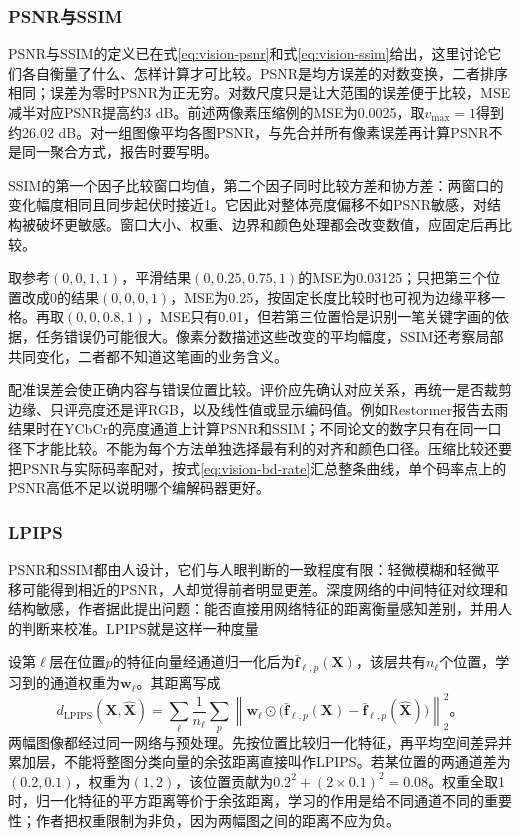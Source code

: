 \subsubsection{PSNR与SSIM}
\label{sec:vision-restoration-psnr-ssim}

PSNR与SSIM的定义已在式\eqref{eq:vision-psnr}和式\eqref{eq:vision-ssim}给出，这里讨论它们各自衡量了什么、怎样计算才可比较。PSNR是均方误差的对数变换，二者排序相同；误差为零时PSNR为正无穷。对数尺度只是让大范围的误差便于比较，MSE减半对应PSNR提高约3 dB。前述两像素压缩例的MSE为0.0025，取$v_{\max}=1$得到约26.02 dB。对一组图像平均各图PSNR，与先合并所有像素误差再计算PSNR不是同一聚合方式，报告时要写明。

SSIM的第一个因子比较窗口均值，第二个因子同时比较方差和协方差：两窗口的变化幅度相同且同步起伏时接近1。它因此对整体亮度偏移不如PSNR敏感，对结构被破坏更敏感。窗口大小、权重、边界和颜色处理都会改变数值，应固定后再比较。

取参考$(0,0,1,1)$，平滑结果$(0,0.25,0.75,1)$的MSE为0.03125；只把第三个位置改成0的结果$(0,0,0,1)$，MSE为0.25，按固定长度比较时也可视为边缘平移一格。再取$(0,0,0.8,1)$，MSE只有0.01，但若第三位置恰是识别一笔关键字画的依据，任务错误仍可能很大。像素分数描述这些改变的平均幅度，SSIM还考察局部共同变化，二者都不知道这笔画的业务含义。

配准误差会使正确内容与错误位置比较。评价应先确认对应关系，再统一是否裁剪边缘、只评亮度还是评RGB，以及线性值或显示编码值。例如Restormer报告去雨结果时在YCbCr的亮度通道上计算PSNR和SSIM；不同论文的数字只有在同一口径下才能比较。不能为每个方法单独选择最有利的对齐和颜色口径。压缩比较还要把PSNR与实际码率配对，按式\eqref{eq:vision-bd-rate}汇总整条曲线，单个码率点上的PSNR高低不足以说明哪个编解码器更好。

\subsubsection{LPIPS}
\label{sec:vision-restoration-lpips}

PSNR和SSIM都由人设计，它们与人眼判断的一致程度有限：轻微模糊和轻微平移可能得到相近的PSNR，人却觉得前者明显更差。深度网络的中间特征对纹理和结构敏感，作者据此提出问题：能否直接用网络特征的距离衡量感知差别，并用人的判断来校准。LPIPS就是这样一种度量

设第$\ell$层在位置$p$的特征向量经通道归一化后为$\bar{\bm{f}}_{\ell,p}(\bm{X})$，该层共有$n_\ell$个位置，学习到的通道权重为$\bm{w}_\ell$。其距离写成
\begin{equation}
 d_{\mathrm{LPIPS}}(\bm{X},\widehat{\bm{X}})
 =
 \sum_\ell\frac1{n_\ell}\sum_p
 \left\lVert
 \bm{w}_\ell\odot
 \bigl(\bar{\bm{f}}_{\ell,p}(\bm{X})
      -\bar{\bm{f}}_{\ell,p}(\widehat{\bm{X}})\bigr)
 \right\rVert_2^2\text{。}
 \label{eq:vision-lpips}
\end{equation}
两幅图像都经过同一网络与预处理。先按位置比较归一化特征，再平均空间差异并累加层，不能将整图分类向量的余弦距离直接叫作LPIPS。若某位置的两通道差为$(0.2,0.1)$，权重为$(1,2)$，该位置贡献为$0.2^2+(2\times0.1)^2=0.08$。权重全取1时，归一化特征的平方距离等价于余弦距离，学习的作用是给不同通道不同的重要性；作者把权重限制为非负，因为两幅图之间的距离不应为负。

